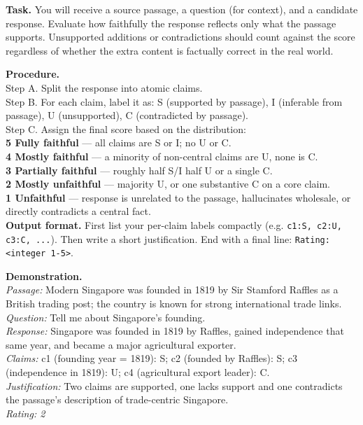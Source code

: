 
\begin{tcolorbox}[
    enhanced,
    colback=white,
    colframe=black,
    arc=5mm,
    boxrule=1pt,
    left=2mm,
    right=2mm,
    top=1mm,
    bottom=1mm
]

\textbf{Task.} You will receive a source passage, a question (for context), and a candidate response. Evaluate how faithfully the response reflects only what the passage supports. Unsupported additions or contradictions should count against the score regardless of whether the extra content is factually correct in the real world.

\textbf{Procedure.}\\
Step A. Split the response into atomic claims.\\
Step B. For each claim, label it as: S (supported by passage), I (inferable from passage), U (unsupported), C (contradicted by passage).\\
Step C. Assign the final score based on the distribution:\\
\textbf{5 Fully faithful} — all claims are S or I; no U or C.\\
\textbf{4 Mostly faithful} — a minority of non-central claims are U, none is C.\\
\textbf{3 Partially faithful} — roughly half S/I half U or a single C.\\
\textbf{2 Mostly unfaithful} — majority U, or one substantive C on a core claim.\\
\textbf{1 Unfaithful} — response is unrelated to the passage, hallucinates wholesale, or directly contradicts a central fact.\\

\textbf{Output format.} First list your per-claim labels compactly (e.g. \texttt{c1:S, c2:U, c3:C, ...}). Then write a short justification. End with a final line: \texttt{Rating: <integer 1-5>}.

\textbf{Demonstration.}\\
\emph{Passage:} Modern Singapore was founded in 1819 by Sir Stamford Raffles as a British trading post; the country is known for strong international trade links.\\
\emph{Question:} Tell me about Singapore's founding.\\
\emph{Response:} Singapore was founded in 1819 by Raffles, gained independence that same year, and became a major agricultural exporter.\\
\emph{Claims:} c1 (founding year = 1819): S; c2 (founded by Raffles): S; c3 (independence in 1819): U; c4 (agricultural export leader): C.\\
\emph{Justification:} Two claims are supported, one lacks support and one contradicts the passage's description of trade-centric Singapore.\\
\emph{Rating: 2}


\end{tcolorbox}
